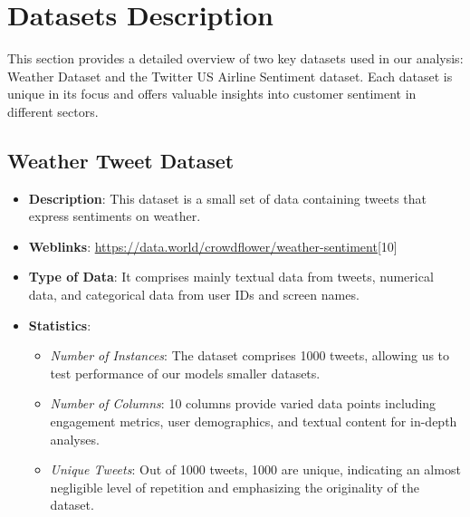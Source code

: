 \documentclass[conference]{IEEEtran}
\begin{document}
\section{Datasets Description}
This section provides a detailed overview of two key datasets used in our analysis: Weather Dataset and the Twitter US Airline Sentiment dataset. 
Each dataset is unique in its focus and offers valuable insights into customer sentiment in different sectors.

\subsection{Weather Tweet Dataset}
\begin{itemize}
    \item \textbf{Description}: This dataset is a small set of data containing tweets that express sentiments on weather.
    
    \item \textbf{Weblinks}: \url{https://data.world/crowdflower/weather-sentiment}[10]
    
    \item \textbf{Type of Data}: It comprises mainly textual data from tweets, numerical data, and categorical data from user IDs and screen names.
    
    \item \textbf{Statistics}:
    \begin{itemize}
        \item \textit{Number of Instances}: The dataset comprises 1000 tweets, allowing us to test performance of our models smaller datasets.
        \item \textit{Number of Columns}: 10 columns provide varied data points including engagement metrics, user demographics, and textual content for in-depth analyses.
        \item \textit{Unique Tweets}: Out of 1000 tweets, 1000 are unique, indicating an almost negligible level of repetition and emphasizing the originality of the dataset.

    \end{itemize}
\end{itemize}
\end{document}
